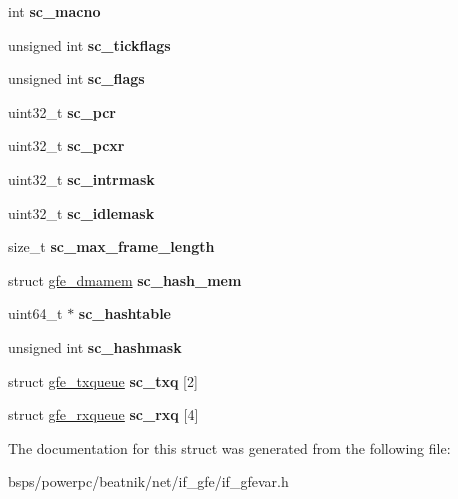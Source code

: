 \begin{DoxyCompactItemize}
int {\bfseries sc\+\_\+macno}
\item 
\mbox{\label{structgfe__softc_adf66c8b355c074805229b28e088477eb}} 
unsigned int {\bfseries sc\+\_\+tickflags}
\item 
\mbox{\label{structgfe__softc_a3167bfbd3f5d561f563374d5f763c27d}} 
unsigned int {\bfseries sc\+\_\+flags}
\item 
\mbox{\label{structgfe__softc_a2894703f74586835d69297f9f9cc81d0}} 
uint32\+\_\+t {\bfseries sc\+\_\+pcr}
\item 
\mbox{\label{structgfe__softc_a8a2b4992c1ade51ee531448ee0d5809b}} 
uint32\+\_\+t {\bfseries sc\+\_\+pcxr}
\item 
\mbox{\label{structgfe__softc_afd8ed7198167b181443d09e63a3fd76e}} 
uint32\+\_\+t {\bfseries sc\+\_\+intrmask}
\item 
\mbox{\label{structgfe__softc_a89f2590ff505c5e1ebd5a7a546e7271f}} 
uint32\+\_\+t {\bfseries sc\+\_\+idlemask}
\item 
\mbox{\label{structgfe__softc_a7999dcf8512df8f9e0610c92aa529314}} 
size\+\_\+t {\bfseries sc\+\_\+max\+\_\+frame\+\_\+length}
\item 
\mbox{\label{structgfe__softc_a866e69571eb78db669376b13e0320c8b}} 
struct \mbox{\hyperlink{structgfe__dmamem}{gfe\+\_\+dmamem}} {\bfseries sc\+\_\+hash\+\_\+mem}
\item 
\mbox{\label{structgfe__softc_a340848c0b4702a51707e68e176c127e5}} 
uint64\+\_\+t $\ast$ {\bfseries sc\+\_\+hashtable}
\item 
\mbox{\label{structgfe__softc_a1dadd215af49ef58a6f6fe30d8301152}} 
unsigned int {\bfseries sc\+\_\+hashmask}
\item 
\mbox{\label{structgfe__softc_a2207a01143cac58336d4b54fe86124b5}} 
struct \mbox{\hyperlink{structgfe__txqueue}{gfe\+\_\+txqueue}} {\bfseries sc\+\_\+txq} \mbox{[}2\mbox{]}
\item 
\mbox{\label{structgfe__softc_ae7591bc2b952b388b980995cc80f6d9d}} 
struct \mbox{\hyperlink{structgfe__rxqueue}{gfe\+\_\+rxqueue}} {\bfseries sc\+\_\+rxq} \mbox{[}4\mbox{]}
\end{DoxyCompactItemize}


The documentation for this struct was generated from the following file\+:\begin{DoxyCompactItemize}
\item 
bsps/powerpc/beatnik/net/if\+\_\+gfe/if\+\_\+gfevar.\+h\end{DoxyCompactItemize}
